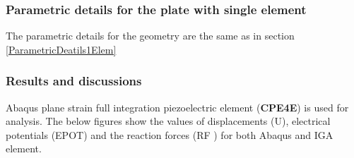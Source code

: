 \documentclass[11pt]{article}
\begin{document}
\subsubsection{Parametric details for the plate with single element}


The parametric details for the geometry are the same as in section \hyperref[ParametricDeatils1Elem]{\ref{ParametricDeatils1Elem}}

\subsubsection{Results and discussions}
Abaqus plane strain full integration piezoelectric element (\textbf{CPE4E}) is used for analysis. The below figures show the values of displacements (U), electrical potentials (EPOT) and the reaction forces (RF ) for both Abaqus and IGA element.\\
\end{document}
